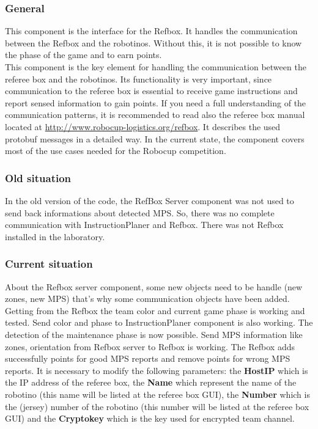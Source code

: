 
\subsubsection{General}

This component is the interface for the Refbox. It handles the communication between the Refbox and the robotinos. Without this, it is not possible to know the phase of the game and to earn points. \\

This component is the key element for handling the communication between the referee box and the robotinos. Its functionality is very important, since communication to the referee box is essential to receive game instructions and report sensed information to gain points. If you need a full understanding of the communication patterns, it is recommended to read also the referee box manual located at \url{ http://www.robocup-logistics.org/refbox}. It describes the used protobuf messages in a detailed way. In the current state, the component covers most of the use cases needed for the Robocup competition.
 

\subsubsection{Old situation}

In the old version of the code, the RefBox Server component was not used to send back informations about detected MPS. So, there was no complete communication with InstructionPlaner and Refbox. There was not Refbox installed in the laboratory. 


\subsubsection{Current situation}

About the Refbox server component, some new objects need to be handle (new zones, new MPS) that’s why some communication objects have been added. Getting from the Refbox the team color and current game phase is working and tested. Send color and phase to InstructionPlaner component is also working. The detection of the maintenance phase is now possible. Send MPS information like zones, orientation from Refbox server to Refbox is working. The Refbox adds successfully points for good MPS reports and remove points for wrong MPS reports. It is necessary to modify the following parameters: the \textbf{HostIP} which is the IP address of the referee box, the \textbf{Name} which represent the name of the robotino (this name will be listed at the referee box GUI), the \textbf{Number} which is the (jersey) number of the robotino (this number will be listed at the referee box GUI) and the \textbf{Cryptokey} which is the key used for encrypted team channel.\\

